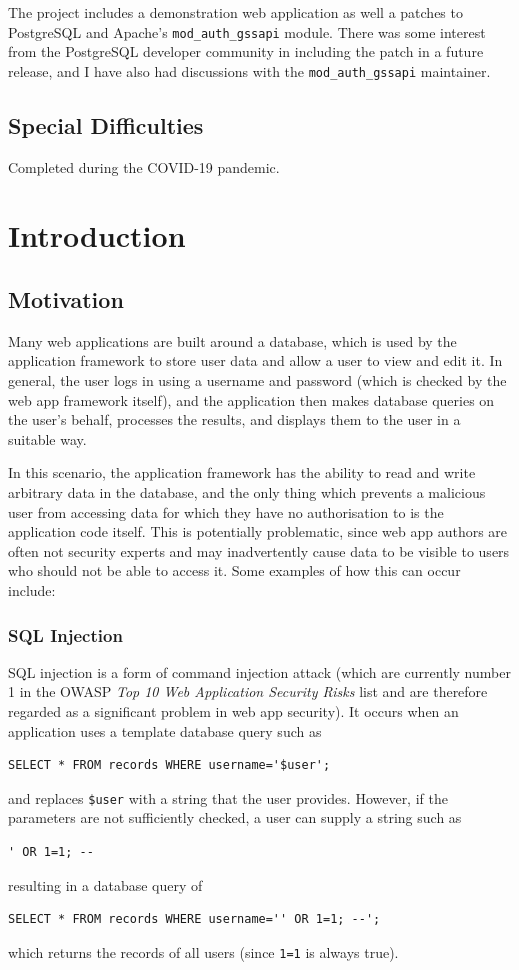 \documentclass[12pt]{report}
\begin{document}
The project includes a demonstration web application as well a patches to PostgreSQL and Apache's \verb+mod_auth_gssapi+ module. There was some interest from the PostgreSQL developer community in including the patch in a future release, and I have also had discussions with the \verb+mod_auth_gssapi+ maintainer.

\section*{Special Difficulties}
Completed during the COVID-19 pandemic.

\tableofcontents

\chapter{Introduction}

\section{Motivation}
\label{sec:motivation}
Many web applications are built around a database, which is used by the application framework to store user data and allow a user to view and edit it. In general, the user logs in using a username and password (which is checked by the web app framework itself), and the application then makes database queries on the user's behalf, processes the results, and displays them to the user in a suitable way.

In this scenario, the application framework has the ability to read and write arbitrary data in the database, and the only thing which prevents a malicious user from accessing data for which they have no authorisation to is the application code itself. This is potentially problematic, since web app authors are often not security experts and may inadvertently cause data to be visible to users who should not be able to access it. Some examples of how this can occur include:

\subsection{SQL Injection}
\label{sec:sql_injection}
SQL injection is a form of command injection attack (which are currently number 1 in the OWASP \textit{Top 10 Web Application Security Risks} list\cite{OWASP10} and are therefore regarded as a significant problem in web app security). It occurs when an application uses a template database query such as
\begin{verbatim}
SELECT * FROM records WHERE username='$user';
\end{verbatim}
and replaces \verb+$user+ with a string that the user provides. However, if the parameters are not sufficiently checked, a user can supply a string such as
\begin{verbatim}
' OR 1=1; --
\end{verbatim}
resulting in a database query of
\begin{verbatim}
SELECT * FROM records WHERE username='' OR 1=1; --';
\end{verbatim}
which returns the records of all users (since \verb+1=1+ is always true).
\end{document}
